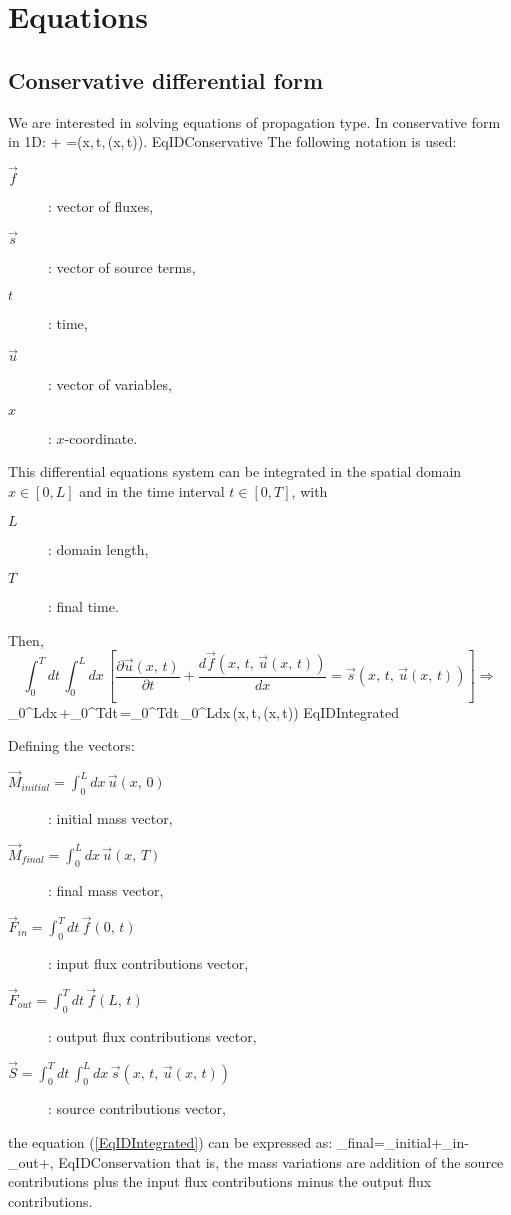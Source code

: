 \chapter{Equations}

\section{Conservative differential form}

We are interested in solving equations of propagation type. In conservative
form in 1D:
\EQ
{
	+
	=\left(x,\,t,\,(x,\,t)\right).
}{EqIDConservative}
The following notation is used:
\begin{description}
	\item[$\vec{f}$]: vector of fluxes,
	\item[$\vec{s}$]: vector of source terms,
	\item[$t$]: time,
	\item[$\vec{u}$]: vector of variables,
	\item[$x$]: $x$-coordinate.
\end{description}

This differential equations system can be integrated in the spatial domain
$x\in[0,L]$ and in the time interval $t\in[0,T]$, with
\begin{description}
	\item[$L$]: domain length,
	\item[$T$]: final time.
\end{description}
Then,
\[
	\int_0^Tdt\,\int_0^Ldx\,\left[
	\frac{\partial\vec{u}(x,\,t)}{\partial t}
	+\frac{d\vec{f}\left(x,\,t,\,\vec{u}(x,\,t)\right)}{dx}
	=\vec{s}\left(x,\,t,\,\vec{u}(x,\,t)\right)\right]\Rightarrow
\]
\EQ
{
	\int_0^Ldx\,
	+\int_0^Tdt\,
	=\int_0^Tdt\,\int_0^Ldx\,\left(x,\,t,\,(x,\,t)\right)
}{EqIDIntegrated}

Defining the vectors:
\begin{description}
	\item[$\vec{M}_{initial}=\int_0^Ldx\,\vec{u}(x,\,0)$]: initial mass vector,
	\item[$\vec{M}_{final}=\int_0^Ldx\,\vec{u}(x,\,T)$]: final mass vector,
	\item[$\vec{F}_{in}=\int_0^Tdt\,\vec{f}(0,\,t)$]: input flux contributions
		vector,
	\item[$\vec{F}_{out}=\int_0^Tdt\,\vec{f}(L,\,t)$]: output flux contributions
		vector,
	\item[$\vec{S}
		=\int_0^Tdt\,\int_0^Ldx\,\vec{s}\left(x,\,t,\,\vec{u}(x,\,t)\right)$]:
		source contributions vector,
\end{description}
the equation (\ref{EqIDIntegrated}) can be expressed as:
\EQ
{
	_{final}=_{initial}+_{in}-_{out}+,
}{EqIDConservation}
that is, the mass variations are addition of the source contributions plus the
input flux contributions minus the output flux contributions.


